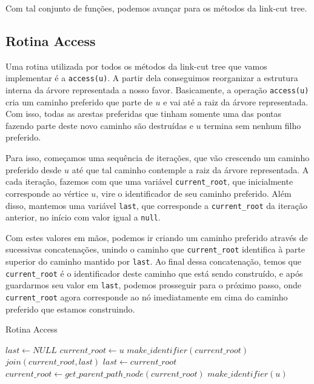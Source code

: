 Com tal conjunto de funções, podemos avançar para os métodos da link-cut tree.

\subsection{Rotina Access}
\label{subsection:lct-access}

Uma rotina utilizada por todos os métodos da link-cut tree que vamos implementar é a \texttt{access(u)}. A partir dela conseguimos reorganizar a estrutura interna da árvore representada a nosso favor. Basicamente, a operação \texttt{access(u)} cria um caminho preferido que parte de $u$ e vai até a raiz da árvore representada. Com isso, todas as arestas preferidas que tinham somente uma das pontas fazendo parte deste novo caminho são destruídas e $u$ termina sem nenhum filho preferido.

Para isso, começamos uma sequência de iterações, que vão crescendo um caminho preferido desde $u$ até que tal caminho contemple a raiz da árvore representada. A cada iteração, fazemos com que uma variável \texttt{current\_root}, que inicialmente corresponde ao vértice $u$, vire o identificador de seu caminho preferido. Além disso, mantemos uma variável \texttt{last}, que corresponde a \texttt{current\_root} da iteração anterior, no início com valor igual a \texttt{null}.

Com estes valores em mãos, podemos ir criando um caminho preferido através de sucessivas concatenações, unindo o caminho que \texttt{current\_root} identifica à parte superior do caminho mantido por \texttt{last}. Ao final dessa concatenação, temos que \texttt{current\_root} é o identificador deste caminho que está sendo construído, e após guardarmos seu valor em \texttt{last}, podemos prosseguir para o próximo passo, onde \texttt{current\_root} agora corresponde ao nó imediatamente em cima do caminho preferido que estamos construindo.

\begin{algorithm}[h!]
    \caption{Rotina Access}\label{lct:access}
    \begin{algorithmic}
        \State $last \gets NULL$
        \State $current\_root \gets u$
        \State {}
        \State $make\_identifier(current\_root)$
        \State {}
        \State $join(current\_root, last)$
        \State $last \gets current\_root$
        \State $current\_root \gets get\_parent\_path\_node(current\_root)$
        \State $make\_identifier(u)$
        \EndWhile
        \EndFunction
    \end{algorithmic}
\end{algorithm}

